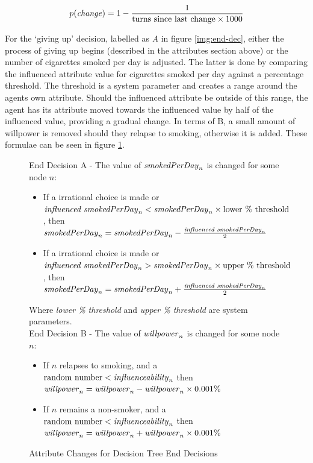 \documentclass[]{report}
\begin{document}
\begin{equation}
p(\text{\emph{change}}) = 1-\frac{1}{\text{turns since last change}\times 1000}
\label{eq:turns}
\end{equation}

For the `giving up' decision, labelled as \emph{A} in figure \ref{img:end-dec}, either the process of giving up begins (described in the attributes section above) or the number of cigarettes smoked per day is adjusted. The latter is done by comparing the influenced attribute value for cigarettes smoked per day against a percentage threshold. The threshold is a system parameter and creates a range around the agents own attribute. Should the influenced attribute be outside of this range, the agent has its attribute moved towards the influenced value by half of the influenced value, providing a gradual change. In terms of B, a small amount of willpower is removed should they relapse to smoking, otherwise it is added. These formulae can be seen in figure \ref{eq:end-attr}.
\begin{figure}
End Decision A - The value of $\text{\emph{smokedPerDay}}_{n}$ is changed for some node $n$:
\begin{itemize}
\item If a irrational choice is made or $\text{\emph{influenced smokedPerDay}}_{n} < \text{\emph{smokedPerDay}}_{n}\times\text{lower \% threshold}$, then $\text{\emph{smokedPerDay}}_{n} = \text{\emph{smokedPerDay}}_{n} - \frac{\text{\emph{influenced smokedPerDay}}_{n}}{2}$ 
\item If a irrational choice is made or $\text{\emph{influenced smokedPerDay}}_{n} > \text{\emph{smokedPerDay}}_{n}\times\text{upper \% threshold}$, then $\text{\emph{smokedPerDay}}_{n} = \text{\emph{smokedPerDay}}_{n} + \frac{\text{\emph{influenced smokedPerDay}}_{n}}{2}$
\end{itemize}
Where \emph{lower \% threshold} and \emph{upper \% threshold} are system parameters.\\

End Decision B - The value of $\text{\emph{willpower}}_{n}$ is changed for some node $n$:
\begin{itemize}
\item If $n$ relapses to smoking, and a $\text{random number} < \text{\emph{influenceability}}_{n}$ then $\text{\emph{willpower}}_{n} = \text{\emph{willpower}}_{n} - \text{\emph{willpower}}_{n}\times 0.001\%$
\item If $n$ remains a non-smoker, and a $\text{random number} < \text{\emph{influenceability}}_{n}$ then $\text{\emph{willpower}}_{n} = \text{\emph{willpower}}_{n} + \text{\emph{willpower}}_{n}\times 0.001\%$
\end{itemize}
\caption{Attribute Changes for Decision Tree End Decisions}
\label{eq:end-attr}
\end{figure}
\end{document}
